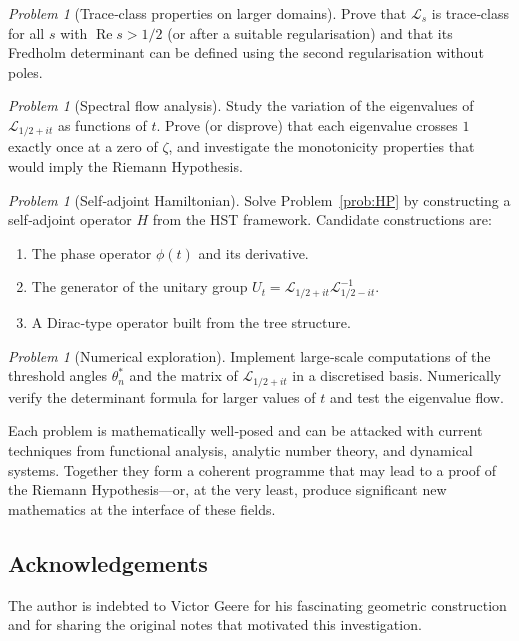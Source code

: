 \documentclass[11pt,a4paper]{article}
\theoremstyle{remark}
\newtheorem{problem}[theorem]{Problem}
\begin{document}
\begin{problem}[Trace‑class properties on larger domains]\label{prob:traceclass}
Prove that \(\mathcal{L}_s\) is trace‑class for all \(s\) with \(\operatorname{Re}s>1/2\) (or after a suitable regularisation) and that its Fredholm determinant can be defined using the second regularisation without poles.
\end{problem}

\begin{problem}[Spectral flow analysis]\label{prob:flow}
Study the variation of the eigenvalues of \(\mathcal{L}_{1/2+it}\) as functions of \(t\). Prove (or disprove) that each eigenvalue crosses \(1\) exactly once at a zero of \(\zeta\), and investigate the monotonicity properties that would imply the Riemann Hypothesis.
\end{problem}

\begin{problem}[Self‑adjoint Hamiltonian]\label{prob:Hamiltonian}
Solve Problem~\ref{prob:HP} by constructing a self‑adjoint operator \(H\) from the HST framework. Candidate constructions are:
\begin{enumerate}
    \item The phase operator \(\phi(t)\) and its derivative.
    \item The generator of the unitary group \(U_t=\mathcal{L}_{1/2+it}\mathcal{L}_{1/2-it}^{-1}\).
    \item A Dirac‑type operator built from the tree structure.
\end{enumerate}
\end{problem}

\begin{problem}[Numerical exploration]\label{prob:numerics}
Implement large‑scale computations of the threshold angles \(\theta_n^*\) and the matrix of \(\mathcal{L}_{1/2+it}\) in a discretised basis. Numerically verify the determinant formula for larger values of \(t\) and test the eigenvalue flow.
\end{problem}

Each problem is mathematically well‑posed and can be attacked with current techniques from functional analysis, analytic number theory, and dynamical systems. Together they form a coherent programme that may lead to a proof of the Riemann Hypothesis—or, at the very least, produce significant new mathematics at the interface of these fields.

\subsection*{Acknowledgements}
The author is indebted to Victor Geere for his fascinating geometric construction and for sharing the original notes that motivated this investigation.
\end{document}
